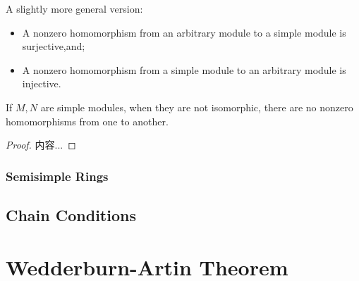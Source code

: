 \documentclass[Total.tex]{subfiles}
\begin{document}
	A slightly more general version: 
	
	\begin{itemize}
		\item A nonzero homomorphism from an arbitrary module to a simple module is surjective,and;
		
		\item  A nonzero
		homomorphism from a simple module to an arbitrary module is injective.
	\end{itemize}
	
	\begin{lemma}
		If $M,N$ are simple modules, when they are not isomorphic, there are no nonzero homomorphisms from one to another.
	\end{lemma}
	
	\begin{proof}
		内容...
	\end{proof}
	
	\subsubsection{Semisimple Rings}
	
	\subsection{Chain Conditions}
	
	\section{Wedderburn-Artin Theorem}
\end{document}
